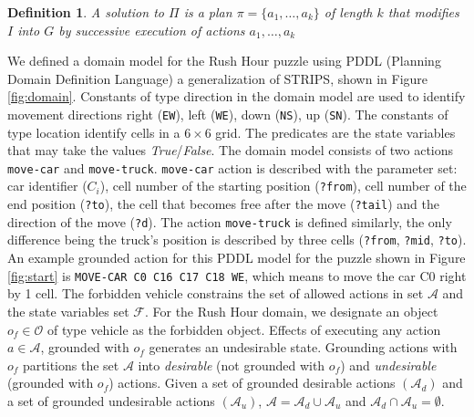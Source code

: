 \documentclass[doctor]{thesis} %
\theoremstyle{plain}
\newtheorem{definition}{Definition}
\begin{document}
\begin{definition}
A solution to $\Pi$ is a plan $\pi=\lbrace a_1, \ldots, a_k\rbrace$ of length $k$ that modifies $I$ into $G$ by successive execution of actions  $a_1, \ldots, a_k$ 
\end{definition}

We defined a domain model for the Rush Hour puzzle using PDDL (Planning Domain Definition Language) a generalization of STRIPS, shown in Figure \ref{fig:domain}. Constants of type direction in the domain model are used to identify movement directions right (\texttt{EW}), left (\texttt{WE}), down (\texttt{NS}), up (\texttt{SN}). The constants of type location identify cells in a $6 \times 6$ grid. The predicates are the state variables that may take the values \textit{True}/\textit{False}. The domain model consists of two actions \texttt{move-car} and \texttt{move-truck}. \texttt{move-car} action is described with the parameter set: car identifier ($C_i$), cell number of the starting position (\texttt{?from}), cell number of the end position (\texttt{?to}), the cell that becomes free after the move (\texttt{?tail}) and the direction of the move (\texttt{?d}). The action \texttt{move-truck} is defined similarly, the only difference being the truck's position is described by three cells (\texttt{?from}, \texttt{?mid}, \texttt{?to}). An example grounded action for this PDDL model for the puzzle shown in Figure \ref{fig:start} is \texttt{MOVE-CAR C0 C16 C17 C18 WE}, which means to move the car C0 right by 1 cell. The forbidden vehicle constrains the set of allowed actions in set $\mathcal{A}$ and the state variables set $\mathcal{F}$. For the Rush Hour domain, we designate an object $o_f \in \mathcal{O}$ of type vehicle as the forbidden object. Effects of executing any action $a \in \mathcal{A}$, grounded with $o_f$ generates an undesirable state. Grounding actions with $o_f$ partitions the set $\mathcal{A}$ into \textit{desirable} (not grounded with $o_f$) and \textit{undesirable} (grounded with $o_f$) actions. Given a set of grounded desirable actions $(\mathcal{A}_d)$ and a set of grounded undesirable actions $(\mathcal{A}_u)$, $\mathcal{A} = \mathcal{A}_d \cup \mathcal{A}_u$ and $\mathcal{A}_d \cap \mathcal{A}_u= \emptyset$.
\end{document}

